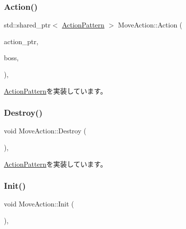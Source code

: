 \subsubsection{\texorpdfstring{Action()}{Action()}}
{\footnotesize\ttfamily std\+::shared\+\_\+ptr$<$ \mbox{\hyperlink{class_action_pattern}{Action\+Pattern}} $>$ Move\+Action\+::\+Action (\begin{DoxyParamCaption}\item[{std\+::shared\+\_\+ptr$<$ \mbox{\hyperlink{class_action_pattern}{Action\+Pattern}} $>$ \&}]{action\+\_\+ptr,  }\item[{\mbox{\hyperlink{class_boss}{Boss}} \&}]{boss,  }\item[{const float}]{ }\end{DoxyParamCaption})\hspace{0.3cm}{\ttfamily [final]}, {\ttfamily [virtual]}}



\mbox{\hyperlink{class_action_pattern_a04c8daf0bf5e263303f7d86aec20eb27}{Action\+Pattern}}を実装しています。

\mbox{\label{class_move_action_a48727a426f2a69ed62631af8385ff6ef}} 
\subsubsection{\texorpdfstring{Destroy()}{Destroy()}}
{\footnotesize\ttfamily void Move\+Action\+::\+Destroy (\begin{DoxyParamCaption}{ }\end{DoxyParamCaption})\hspace{0.3cm}{\ttfamily [final]}, {\ttfamily [virtual]}}



\mbox{\hyperlink{class_action_pattern_a73833df08867c4f4785ddf51344eca47}{Action\+Pattern}}を実装しています。

\mbox{\label{class_move_action_a0861a4a0fcbab38f8c33ed02b9f3c1b8}} 
\subsubsection{\texorpdfstring{Init()}{Init()}}
{\footnotesize\ttfamily void Move\+Action\+::\+Init (\begin{DoxyParamCaption}{ }\end{DoxyParamCaption})\hspace{0.3cm}{\ttfamily [final]}, {\ttfamily [virtual]}}



